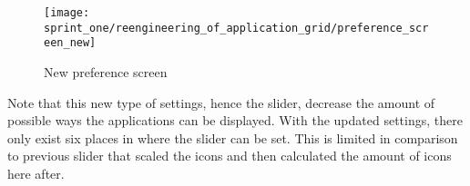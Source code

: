 \begin{figure}[!htbp]
    \centering
    \texttt{[image: sprint\_one/reengineering\_of\_application\_grid/preference\_screen\_new]}
    \caption{New preference screen}
    \label{fig:preference_screen_new}
\end{figure}
Note that this new type of settings, hence the slider, decrease the amount of possible ways the applications can be displayed. With the updated settings, there only exist six places in where the slider can be set. This is limited in comparison to previous slider that scaled the icons and then calculated the amount of icons here after.
